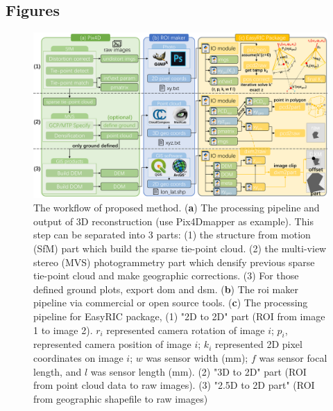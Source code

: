 \documentclass{configs/bmcart}
\begin{document}
\begin{backmatter}

\section*{Figures}

\begin{figure}[h]
  \includegraphics[width=0.95\linewidth]{figures/workflow.pdf}
  \caption{The workflow of proposed method. (\textbf{a}) The processing pipeline and output of 3D reconstruction (use Pix4Dmapper as example). This step can be separated into 3 parts: (1) the structure from motion (SfM) part which build the sparse tie-point cloud. (2) the multi-view stereo (MVS) photogrammetry part which densify previous sparse tie-point cloud and make geographic corrections. (3) For those defined ground plots, export \acrfull*{dom} and \acrfull*{dsm}. (\textbf{b}) The \acrfull*{roi} maker pipeline via commercial or open source tools. (\textbf{c}) The processing pipeline for EasyRIC package, (1) "2D to 2D" part (ROI from image 1 to image 2). $r_i$ represented camera rotation of image $i$; $p_i$, represented camera position of image $i$; $k_i$ represented 2D pixel coordinates on image $i$; $w$ was sensor width (mm); $f$ was sensor focal length, and $l$ was sensor length (mm). (2) "3D to 2D" part (ROI from point cloud data to raw images). (3) "2.5D to 2D part" (ROI from geographic shapefile to raw images)}
  \label{fig:workflow}
\end{figure}


\end{backmatter}
\end{document}
